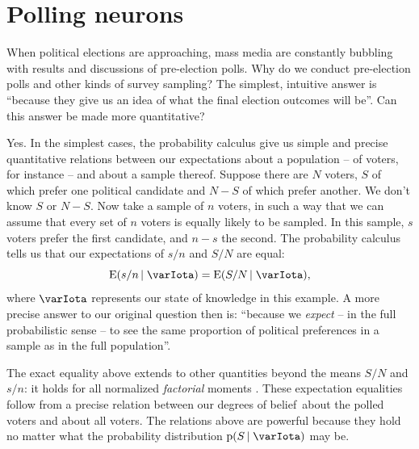 \documentclass[\ifafour a4paper,12pt,\else a5paper,10pt,\fi%
onecolumn,oneside,article,%
british%
]{memoir}
\theoremstyle{remark}
\theoremstyle{innote}
\newcommand*{\citep}{\parencites}
\newcommand*{\pf}{\mathrm{p}}%
\newcommand*{\E}{\mathrm{E}}
\renewcommand*{\|}{\nonscript\,\vert\nonscript\;\mathopen{}}
\newcommand*{\sect}{\S}%
\newcommand*{\dobs}{degrees of belief}
\newcommand*{\yH}{\varIota}
\begin{document}

\section{Polling neurons}
\label{sec:polls}

When political elections are approaching, mass media are constantly
bubbling with results and discussions of pre-election polls. Why do we
conduct pre-election polls and other kinds of survey sampling? The
simplest, intuitive answer is \enquote{because they give us an idea of what
  the final election outcomes will be}. Can this answer be made more
quantitative?

Yes. In the simplest cases, the probability calculus give us simple and
precise quantitative relations between our expectations about a population
-- of voters, for instance -- and about a sample thereof. Suppose there are
$N$ voters, $S$ of which prefer one political candidate and $N-S$ of which
prefer another. We don't know $S$ or $N-S$. Now take a sample of $n$
voters, in such a way that we can assume that every set of $n$ voters is
equally likely to be sampled. In this sample, $s$ voters prefer the first
candidate, and $n-s$ the second. The probability calculus tells us that our
expectations of $s/n$ and $S/N$ are equal:
\begin{equation}\label{eq:poll_equal_expectations}
  \E(s/n \| \yH) = \E(S/N \| \yH),
\end{equation}
where $\yH$ represents our state of knowledge in this example. A more
precise answer to our original question then is: \enquote{because we
  \emph{expect} -- in the full probabilistic sense -- to see the same
  proportion of political preferences in a sample as in the full
  population}.

The exact equality above extends to other quantities beyond the means $S/N$
and $s/n$: it holds for all normalized \emph{factorial} moments
\citep{potts1953,broca2005}[\sect~A]{portamanaetal2015}. These expectation
equalities follow from a precise relation between our \dobs\ about the
polled voters and about all voters. The relations above are powerful
because they hold no matter what the probability distribution $\pf(S\|\yH)$
may be.

\bigskip
\end{document}
